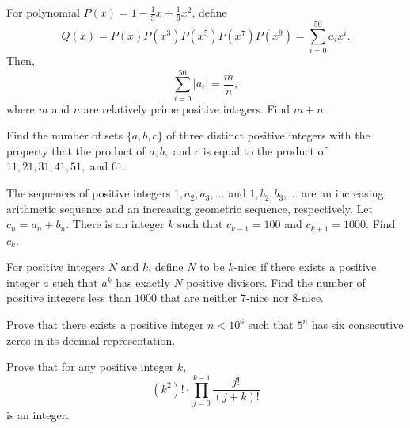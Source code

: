 \documentclass[problems.tex]{subfile}
\begin{document}
	
	
	\begin{problem}
		For polynomial $P(x)=1-\frac{1}{3}x+\frac{1}{6}x^2$, define \[ Q(x) = P(x)P(x^3)P(x^5)P(x^7)P(x^9) = \sum\limits_{i=0}^{50}a_ix^i. \]Then, \[\sum\limits_{i=0}^{50}|a_i|=\frac{m}{n},\] where $m$ and $n$ are relatively prime positive integers. Find $m+n$. %
	\end{problem}
	
	
	\begin{problem}
		Find the number of sets $\{a,b,c\}$ of three distinct positive integers with the property that the product of $a,b,$ and $c$ is equal to the product of $11,21,31,41,51,$ and $61$. %
	\end{problem}
	
	
	\begin{problem}
		The sequences of positive integers $1,a_2,a_3,\ldots$ and $1,b_2,b_3,\ldots$ are an increasing arithmetic sequence and an increasing geometric sequence, respectively. Let $c_n=a_n+b_n$. There is an integer $k$ such that $c_{k-1}=100$ and $c_{k+1}=1000$. Find $c_k$. %
	\end{problem}
	
	
	
	\begin{problem}
		For positive integers $N$ and $k$, define $N$ to be $k$-nice if there exists a positive integer $a$ such that $a^k$ has exactly $N$ positive divisors. Find the number of positive integers less than $1000$ that are neither $7$-nice nor $8$-nice. %
	\end{problem}
	
	
	\begin{problem}[USAJMO 2016]
		Prove that there exists a positive integer $n < 10^6$ such that $5^n$ has six consecutive zeros in its decimal representation. %
	\end{problem}
	
	\begin{problem}[USAMO 2016]
		Prove that for any positive integer $k$, \[(k^2)!\cdot\displaystyle\prod_{j=0}^{k-1}\frac{j!}{(j+k)!}\]is an integer. %
	\end{problem}
	
\end{document}
